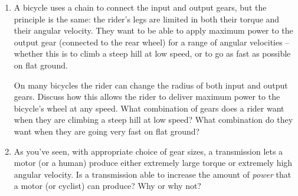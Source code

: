 \documentclass[12pt]{article}
\begin{document}
\begin{enumerate}
\newpage


\item A bicycle uses a chain to connect the input and output gears, but the principle is the same: the rider's legs are limited in both their torque and their angular velocity. They want to be able to apply maximum power to the output gear (connected to the rear wheel) for a range of angular velocities -- whether this is to climb a steep hill at low speed, or to go as fast as possible on flat ground. 

On many bicycles the rider can change the radius of both input and output gears. Discuss how this allows the rider to deliver maximum power to the bicycle's wheel at any speed. What combination of gears does a rider want when they are climbing a steep hill at low speed? What combination do they want when they are going very fast on flat ground?

\vspace{3in}


\item As you've seen, with appropriate choice of gear sizes, a transmission lets a motor (or a human) produce either extremely large torque or extremely high angular velocity. Is a transmission able to increase the amount of {\it power} that a motor (or cyclist) can produce? Why or why not?

\end{enumerate}

\newpage
\end{document}
